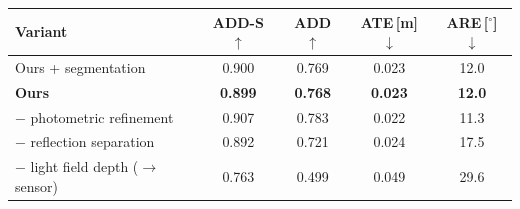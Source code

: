 \begin{tabular}{lcccc}
\toprule
Variant & ADD-S $\uparrow$ & ADD $\uparrow$ & ATE\,[m] $\downarrow$ & ARE\,[$^\circ$] $\downarrow$ \\
\midrule
Ours + segmentation & 0.900 & 0.769 & 0.023 & 12.0 \\
\textbf{Ours} & \textbf{0.899} & \textbf{0.768} & \textbf{0.023} & \textbf{12.0} \\
$-$ photometric refinement & 0.907 & 0.783 & 0.022 & 11.3 \\
$-$ reflection separation & 0.892 & 0.721 & 0.024 & 17.5 \\
$-$ light field depth ($\rightarrow$ sensor) & 0.763 & 0.499 & 0.049 & 29.6 \\
\bottomrule
\end{tabular}
